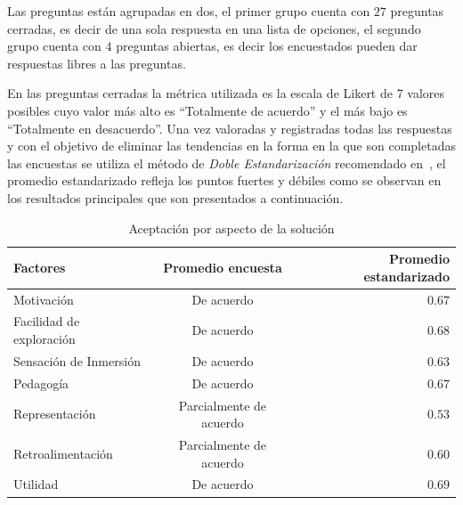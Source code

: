 Las preguntas están agrupadas en dos, el primer grupo cuenta con $27$ 
preguntas cerradas, es decir de una sola respuesta en una lista de opciones, 
el segundo grupo cuenta con $4$ preguntas abiertas, es decir los encuestados 
pueden dar respuestas libres a las preguntas. 

En las preguntas cerradas la métrica utilizada es la escala de Likert
\cite{Allen:2007} de 7 valores posibles cuyo valor más alto es
\enquote{Totalmente de acuerdo} y el más bajo es \enquote{Totalmente en 
desacuerdo}. Una vez valoradas y registradas todas las respuestas y con el 
objetivo de eliminar las tendencias en la forma en la que son completadas las
encuestas\cite{Fischer2010} se utiliza el método de \emph{Doble 
Estandarización} recomendado en~\cite{Pagolu2011}, el promedio estandarizado 
refleja los puntos fuertes y débiles como se observan en los resultados 
principales que son presentados a continuación. 

\begin{table}[H]
\centering
\caption{Aceptación por aspecto de la solución}
\begin{tabular}{lcr}
\toprule
Factores        & Promedio encuesta      & Promedio estandarizado \\
\midrule
Motivación               & De acuerdo              & $0.67$  \\
Facilidad de exploración & De acuerdo              & $0.68$  \\
Sensación de Inmersión   & De acuerdo              & $0.63$  \\
Pedagogía                & De acuerdo              & $0.67$  \\
Representación           & Parcialmente de acuerdo & $0.53$  \\
Retroalimentación        & Parcialmente de acuerdo & $0.60$  \\
Utilidad                 & De acuerdo              & $0.69$  \\
\bottomrule
\end{tabular}
\label{tab:resultado_resumen_aspectos_aceptacion}
\end{table}

